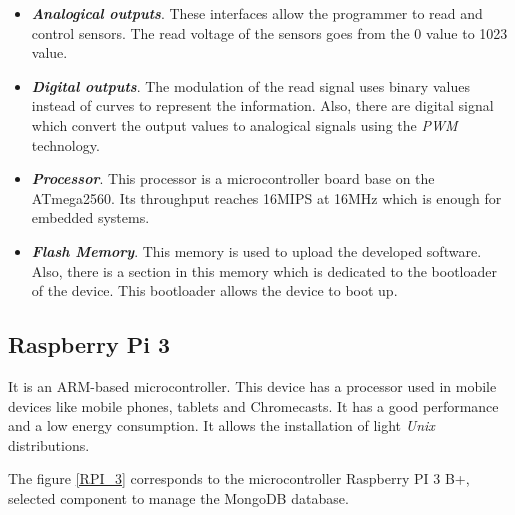 \begin{itemize}

\item \textbf{\textit{Analogical outputs}}. These interfaces allow the programmer to read and control sensors. The read voltage of the sensors goes from the 0 value to 1023 value.

\item \textbf{\textit{Digital outputs}}. The modulation of the read signal uses binary values instead of curves to represent the information. Also, there are digital signal which convert the output values to analogical signals using the \textit{PWM} technology.

\item \textbf{\textit{Processor}}. This processor is a microcontroller board base on the ATmega2560. Its throughput reaches 16MIPS at 16MHz which is enough for embedded systems.

\item \textbf{\textit{Flash Memory}}. This memory is used to upload the developed software. Also, there is a section in this memory which is dedicated to the bootloader of the device. This bootloader allows the device to boot up.

\end{itemize}

\subsection{Raspberry Pi 3}

It is an ARM-based microcontroller. This device has a processor used in mobile devices like mobile phones, tablets and Chromecasts. It has a good performance and a low energy consumption. It allows the installation of light \textit{Unix} distributions.

The figure \ref{RPI_3} corresponds to the microcontroller Raspberry PI 3 B+, selected component to manage the MongoDB database.
	

